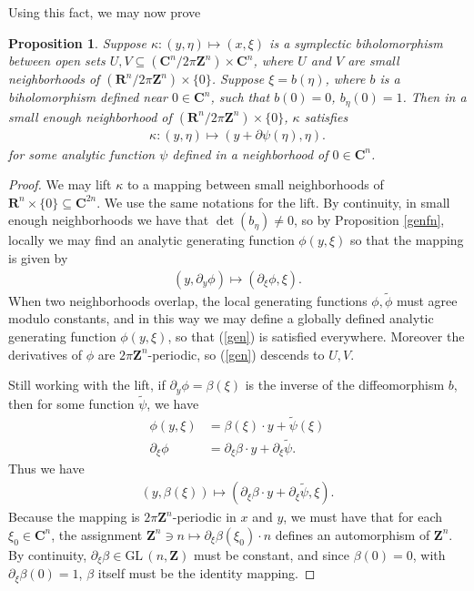 \documentclass[12pt,lettersize]{article}
\newcommand{\tw}{\widetilde}%
\newcommand{\maps}{\colon}
\theoremstyle{plain}%
\newtheorem{prop}[theorem]{Proposition}
\numberwithin{theorem}{section}
\numberwithin{equation}{section}
\theoremstyle{definition}
\theoremstyle{remark}
\begin{document}
{Using this fact, we may now prove

\begin{prop} \label{uniq}
Suppose $\kappa\maps (y,\eta) \mapsto (x,\xi)$ is a symplectic biholomorphism between open sets $U,V \subseteq (\mathbf{C}^n / 2\pi\mathbf{Z}^n) \times \mathbf{C}^n$, where $U$ and $V$ are small neighborhoods of $(\mathbf{R}^n/2\pi\mathbf{Z}^n) \times \{0\}$. Suppose $\xi = b(\eta)$, where $b$ is a biholomorphism defined near $0 \in \mathbf{C}^n$, such that $b(0) = 0$, $b_\eta(0) = 1$. Then in a small enough neighborhood of $(\mathbf{R}^n/2\pi\mathbf{Z}^n) \times \{0\}$, $\kappa$ satisfies 
\begin{align*}
\kappa: (y,\eta) \mapsto (y +  \partial \psi(\eta), \eta).
\end{align*}
for some analytic function $\psi$ defined in a neighborhood of $0 \in \mathbf{C}^n$.
\end{prop}

\begin{proof}

We may lift $\kappa$ to a mapping between small neighborhoods of $\mathbf{R}^n \times \{0\} \subseteq \mathbf{C}^{2n}$. We use the same notations for the lift. By continuity, in small enough neighborhoods we have that $\det(b_\eta) \neq 0$, so by Proposition \ref{genfn}, locally we may find an analytic generating function $\phi(y,\xi)$ so that the mapping is given by
%
\begin{align}\label{gen}
(y,\partial_y\phi)\mapsto (\partial_\xi \phi,\xi).
\end{align}
%
When two neighborhoods overlap, the local generating functions $\phi,\tw \phi$ must agree modulo constants, and in this way we may define a globally defined analytic generating function $\phi(y,\xi)$, so that (\ref{gen}) is satisfied everywhere. Moreover the derivatives of $\phi$ are $2\pi\mathbf{Z}^n$-periodic, so (\ref{gen}) descends to $U,V$. 

Still working with the lift, if $\partial_y \phi = \beta(\xi)$ is the inverse of the diffeomorphism $b$, then for some function $\tw \psi$, we have
%
\begin{align*}{}
\phi(y,\xi) &= \beta(\xi)\cdot y + \tw \psi(\xi) \\
\partial_\xi \phi &= \partial_\xi \beta\cdot y + \partial_\xi \tw \psi. 
\end{align*}
%
Thus we have
%
\begin{align*}{}
(y,\beta(\xi)) \mapsto (\partial_\xi \beta\cdot y + \partial_\xi \tw \psi,\xi).
\end{align*}
%
Because the mapping is $2\pi\mathbf{Z}^n$-periodic in $x$ and $y$, we must have that for each $\xi_0 \in \mathbf{C}^n$, the assignment $\mathbf{Z}^n \ni n  \mapsto \partial_\xi \beta(\xi_0) \cdot n$ defines an automorphism of $\mathbf{Z}^n$. By continuity, $\partial_\xi\beta \in\mbox{GL}\,(n,\mathbf{Z})$ must be constant, and since $\beta(0) = 0$, with $\partial_\xi \beta(0) = 1$, $\beta$ itself must be the identity mapping. 


\end{proof}}
\end{document}
